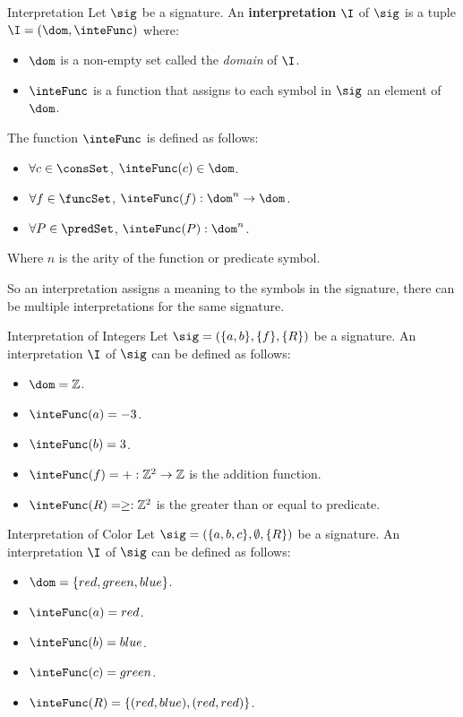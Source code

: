 \begin{definition}{Interpretation}
    Let $\sig$ be a signature.
    An \textbf{interpretation} $\I$ of $\sig$ is a tuple $\I = (\dom,\inteFunc)$ where:
    \begin{itemize}
        \item $\dom$ is a non-empty set called the \textit{domain} of $\I$.
        \item $\inteFunc$ is a function that assigns to each symbol in $\sig$ 
        an element of $\dom$.
    \end{itemize}
    The function $\inteFunc$ is defined as follows:
    \begin{itemize}
        \item $\forall c \in \consSet$, $\inteFunc(c) \in \dom$.
        \item $\forall f \in \funcSet$, 
        $\inteFunc(f) : \dom^n \to \dom$.
        \item $\forall P \in \predSet$, 
        $\inteFunc(P) : \dom^n$.
    \end{itemize}
    Where $n$ is the arity of the function or predicate symbol.
\end{definition}

So an interpretation assigns a meaning to the symbols in the signature, 
there can be multiple interpretations for the same signature.

\begin{example}{Interpretation of Integers}
    Let $\sig = (\{a,b\},\{f\},\{R\})$ be a signature.
    An interpretation $\I$ of $\sig$ can be defined as follows:
    \begin{itemize}
        \item $\dom = \mathbb{Z}$.
        \item $\inteFunc(a) = -3$.
        \item $\inteFunc(b) = 3$.
        \item $\inteFunc(f) = + : \mathbb{Z}^2 \to \mathbb{Z}$ is the addition function.
        \item $\inteFunc(R) = \geq : \mathbb{Z}^2$ is the greater than or equal to predicate.
    \end{itemize}
\end{example}

\begin{example}{Interpretation of Color}
    Let $\sig = (\{a,b,c\},\emptyset,\{R\})$ be a signature.
    An interpretation $\I$ of $\sig$ can be defined as follows:
    \begin{itemize}
        \item $\dom = \{red,green,blue\}$.
        \item $\inteFunc(a) = red$.
        \item $\inteFunc(b) = blue$.
        \item $\inteFunc(c) = green$.
        \item $\inteFunc(R) = \{(red,blue),(red,red)\}$.
    \end{itemize}
\end{example}

